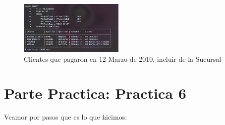 \documentclass[12pt, fleqn]{article}                             %
\begin{document}
        \begin{figure}[ht!]
            \centering
            \includegraphics[width=0.45\textwidth]{BD5Reporte2Parte5}
            \caption{Clientes que pagaron en 12 Marzo de 2010, incluir de la Sucursal}
        \end{figure}







\clearpage
\section{Parte Practica: Practica 6}

    Veamor por pasos que es lo que hicimos:
\end{document}
